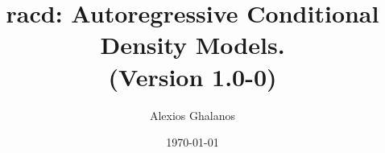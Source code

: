 \documentclass[11pt,a4paper]{article}
\begin{document}
\title{racd: Autoregressive Conditional Density Models.\\
(Version 1.0-0)}
\author{Alexios Ghalanos}
\date{\today}
\maketitle
\tableofcontents
\newpage

\clearpage

\end{document}
